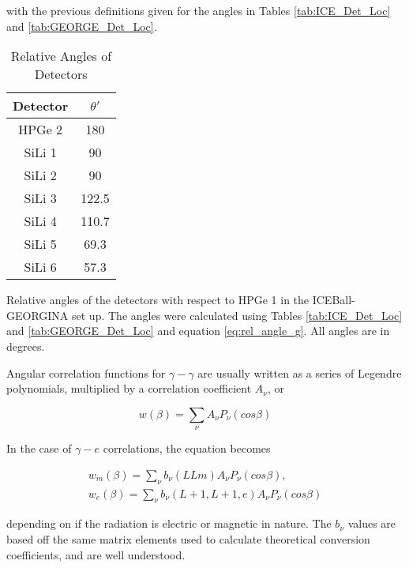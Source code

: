 with the previous definitions given for the angles in Tables \ref{tab:ICE_Det_Loc} and \ref{tab:GEORGE_Det_Loc}.

\begin{table}[]
    \centering
    \caption{Relative Angles of Detectors}
    \begin{tabular}{c|c} \toprule
         Detector & $\theta '$  \\
         \hline 
         HPGe 2 & 180 \\
         SiLi 1 & 90\\
         SiLi 2 & 90\\
         SiLi 3 & 122.5\\
         SiLi 4 & 110.7\\
         SiLi 5 & 69.3 \\
         SiLi 6 & 57.3 \\ \bottomrule
    \end{tabular}
    \footnotesize
    \item Relative angles of the detectors with respect to HPGe 1 in the ICEBall-GEORGINA set up. The angles were calculated using Tables \ref{tab:ICE_Det_Loc} and \ref{tab:GEORGE_Det_Loc} and equation \ref{eq:rel_angle_g}. All angles are in degrees.
    \label{tab:rel_angle_g}
\end{table}

Angular correlation functions for $\gamma-\gamma$ are usually written as a series of Legendre polynomials, multiplied by a correlation coefficient $A_\nu$, or

\begin{equation}
    w(\beta) = \sum_\nu A_\nu P_\nu(cos\beta)
    \label{eq:ge_corr}
\end{equation}

In the case of $\gamma-e$ correlations, the equation becomes 

\begin{equation}
    \begin{split}
        w_m(\beta) = \sum_\nu b_\nu(LLm) A_\nu P_\nu(cos\beta), \\
        w_e(\beta) = \sum_\nu b_\nu(L+1,L+1,e) A_\nu P_\nu(cos\beta)
        \label{eq:e_corr}
    \end{split}
\end{equation}

depending on if the radiation is electric or magnetic in nature. The $b_\nu$ values are based off the same matrix elements used to calculate theoretical conversion coefficients, and are well understood\citep{rose51:_internal_conversion, rose52:_internal_conversion}.

